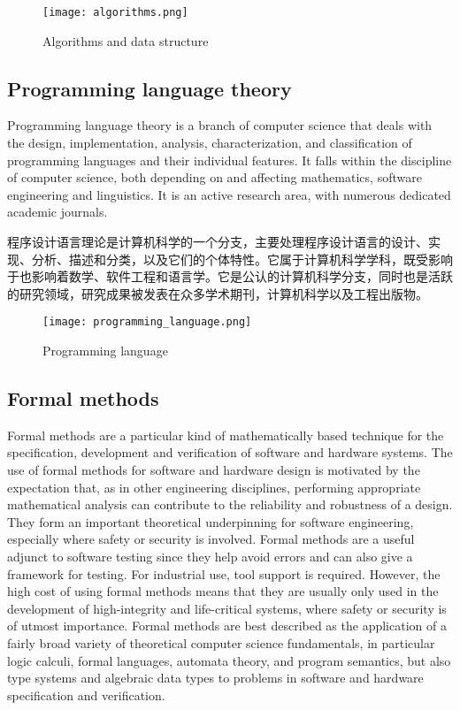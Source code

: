 \begin{figure}[!h]
\centering
\texttt{[image: algorithms.png]}
\caption{Algorithms and data structure}
\label{algorithms_data_structure}
\end{figure}







\subsection{Programming language theory}

Programming language theory is a branch of computer science that deals with the design, implementation, analysis, characterization, and classification of programming languages and their individual features. It falls within the discipline of computer science, both depending on and affecting mathematics, software engineering and linguistics. It is an active research area, with numerous dedicated academic journals.

程序设计语言理论是计算机科学的一个分支，主要处理程序设计语言的设计、实现、分析、描述和分类，以及它们的个体特性。它属于计算机科学学科，既受影响于也影响着数学、软件工程和语言学。它是公认的计算机科学分支，同时也是活跃的研究领域，研究成果被发表在众多学术期刊，计算机科学以及工程出版物。

\begin{figure}[!h]
\centering
\texttt{[image: programming\_language.png]}
\caption{Programming language}
\label{programming_language}
\end{figure}







\subsection{Formal methods}

Formal methods are a particular kind of mathematically based technique for the specification, development and verification of software and hardware systems. The use of formal methods for software and hardware design is motivated by the expectation that, as in other engineering disciplines, performing appropriate mathematical analysis can contribute to the reliability and robustness of a design. They form an important theoretical underpinning for software engineering, especially where safety or security is involved. Formal methods are a useful adjunct to software testing since they help avoid errors and can also give a framework for testing. For industrial use, tool support is required. However, the high cost of using formal methods means that they are usually only used in the development of high-integrity and life-critical systems, where safety or security is of utmost importance. Formal methods are best described as the application of a fairly broad variety of theoretical computer science fundamentals, in particular logic calculi, formal languages, automata theory, and program semantics, but also type systems and algebraic data types to problems in software and hardware specification and verification.

